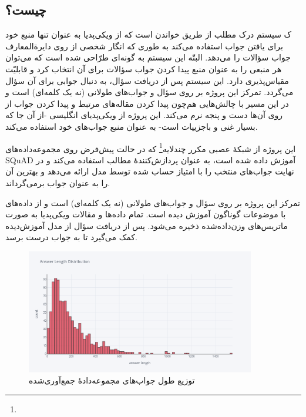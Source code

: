 \documentclass{CCI2020}
\begin{document}
\subsection{ چیست؟}
ک سیستم درک مطلب از طریق خواندن است که از ویکی‌پدیا به عنوان تنها منبع خود برای یافتن جواب استفاده می‌کند به طوری که انگار شخصی از روی دایرة‌المعارف جواب سؤالات را می‌دهد. البتّه این سیستم به گونه‌ای طرّاحی شده است که می‌توان هر منبعی را به عنوان منبع پیدا کردن جواب سؤالات برای آن انتخاب کرد و قابلیّت مقیاس‌پذیری دارد. این سیستم پس از دریافت سؤال، به دنبال جوابی برای آن سؤال می‌گردد. تمرکز این پروژه بر روی سؤال و جواب‌های طولانی (نه یک کلمه‌ای) است و در این مسیر با چالش‌هایی هم‌چون پیدا کردن مقاله‌های مرتبط و پیدا کردن جواب از روی آن‌ها دست و پنجه نرم می‌کند. این پروژه از ویکی‌پدیای انگلیسی -از آن جا که بسیار غنی و باجزییات است- به عنوان منبع جواب‌های خود استفاده می‌کند.

این پروژه از شبکهٔ عصبی مکرر چندلایه\footnote{} که در حالت پیش‌فرض روی مجموعه‌داده‌های SQuAD آموزش داده شده است، به عنوان پردازش‌کنندهٔ مطالب استفاده می‌کند و در نهایت جواب‌های منتخب را با امتیاز حساب شده توسط مدل ارائه می‌دهد و بهترین آن را به عنوان جواب برمی‌گرداند.

تمرکز این پروژه بر روی سؤال و جواب‌های طولانی (نه یک کلمه‌ای) است و از داده‌های با موضوعات گوناگون آموزش دیده است. تمام داده‌ها و مقالات ویکی‌پدیا به صورت ماتریس‌های وزن‌داده‌شده  ذخیره می‌شود. پس از دریافت سؤال از مدل آموزش‌دیده کمک می‌گیرد تا به جواب درست برسد.


\begin{figure}[!htp]
    \centering
    \includegraphics[width=10cm]{images/newplot.png}
    \caption{توزیع طول جواب‌های مجموعه‌دادهٔ جمع‌آوری‌شده}
    \label{fig:galaxy}
\end{figure}
\end{document}
